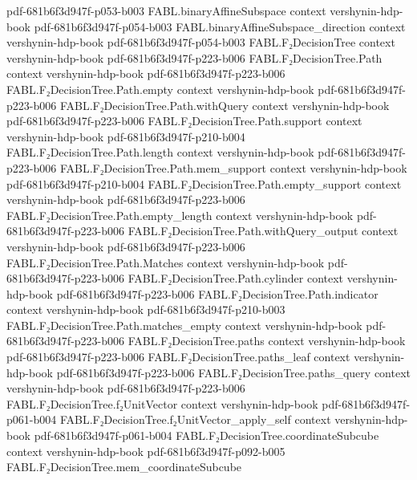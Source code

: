 \begin{theorem}
  {pdf-681b6f3d947f-p053-b003}
\proofstep
  {FABL.binaryAffineSubspace}
  {context}
  {vershynin-hdp-book}
  {pdf-681b6f3d947f-p054-b003}
\proofstep
  {FABL.binaryAffineSubspace_direction}
  {context}
  {vershynin-hdp-book}
  {pdf-681b6f3d947f-p054-b003}
\proofstep
  {FABL.F₂DecisionTree}
  {context}
  {vershynin-hdp-book}
  {pdf-681b6f3d947f-p223-b006}
\proofstep
  {FABL.F₂DecisionTree.Path}
  {context}
  {vershynin-hdp-book}
  {pdf-681b6f3d947f-p223-b006}
\proofstep
  {FABL.F₂DecisionTree.Path.empty}
  {context}
  {vershynin-hdp-book}
  {pdf-681b6f3d947f-p223-b006}
\proofstep
  {FABL.F₂DecisionTree.Path.withQuery}
  {context}
  {vershynin-hdp-book}
  {pdf-681b6f3d947f-p223-b006}
\proofstep
  {FABL.F₂DecisionTree.Path.support}
  {context}
  {vershynin-hdp-book}
  {pdf-681b6f3d947f-p210-b004}
\proofstep
  {FABL.F₂DecisionTree.Path.length}
  {context}
  {vershynin-hdp-book}
  {pdf-681b6f3d947f-p223-b006}
\proofstep
  {FABL.F₂DecisionTree.Path.mem_support}
  {context}
  {vershynin-hdp-book}
  {pdf-681b6f3d947f-p210-b004}
\proofstep
  {FABL.F₂DecisionTree.Path.empty_support}
  {context}
  {vershynin-hdp-book}
  {pdf-681b6f3d947f-p223-b006}
\proofstep
  {FABL.F₂DecisionTree.Path.empty_length}
  {context}
  {vershynin-hdp-book}
  {pdf-681b6f3d947f-p223-b006}
\proofstep
  {FABL.F₂DecisionTree.Path.withQuery_output}
  {context}
  {vershynin-hdp-book}
  {pdf-681b6f3d947f-p223-b006}
\proofstep
  {FABL.F₂DecisionTree.Path.Matches}
  {context}
  {vershynin-hdp-book}
  {pdf-681b6f3d947f-p223-b006}
\proofstep
  {FABL.F₂DecisionTree.Path.cylinder}
  {context}
  {vershynin-hdp-book}
  {pdf-681b6f3d947f-p223-b006}
\proofstep
  {FABL.F₂DecisionTree.Path.indicator}
  {context}
  {vershynin-hdp-book}
  {pdf-681b6f3d947f-p210-b003}
\proofstep
  {FABL.F₂DecisionTree.Path.matches_empty}
  {context}
  {vershynin-hdp-book}
  {pdf-681b6f3d947f-p223-b006}
\proofstep
  {FABL.F₂DecisionTree.paths}
  {context}
  {vershynin-hdp-book}
  {pdf-681b6f3d947f-p223-b006}
\proofstep
  {FABL.F₂DecisionTree.paths_leaf}
  {context}
  {vershynin-hdp-book}
  {pdf-681b6f3d947f-p223-b006}
\proofstep
  {FABL.F₂DecisionTree.paths_query}
  {context}
  {vershynin-hdp-book}
  {pdf-681b6f3d947f-p223-b006}
\proofstep
  {FABL.F₂DecisionTree.f₂UnitVector}
  {context}
  {vershynin-hdp-book}
  {pdf-681b6f3d947f-p061-b004}
\proofstep
  {FABL.F₂DecisionTree.f₂UnitVector_apply_self}
  {context}
  {vershynin-hdp-book}
  {pdf-681b6f3d947f-p061-b004}
\proofstep
  {FABL.F₂DecisionTree.coordinateSubcube}
  {context}
  {vershynin-hdp-book}
  {pdf-681b6f3d947f-p092-b005}
\proofstep
  {FABL.F₂DecisionTree.mem_coordinateSubcube}

\end{theorem}
